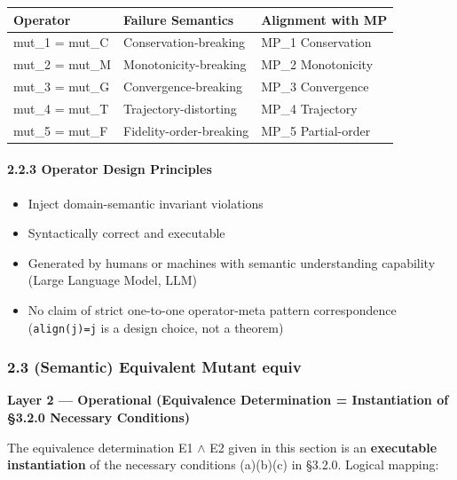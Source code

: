 \documentclass[review,12pt,authoryear]{elsarticle}
\providecommand{\tightlist}{\setlength{\itemsep}{0pt}\setlength{\parskip}{0pt}}
\begin{document}
{\def\LTcaptype{none} %
\begin{longtable}[]{@{}lll@{}}
\toprule\noalign{}
Operator & Failure Semantics & Alignment with MP \\
\midrule\noalign{}
\endhead
\bottomrule\noalign{}
\endlastfoot
mut\_1 = mut\_C & Conservation-breaking & MP\_1 Conservation \\
mut\_2 = mut\_M & Monotonicity-breaking & MP\_2 Monotonicity \\
mut\_3 = mut\_G & Convergence-breaking & MP\_3 Convergence \\
mut\_4 = mut\_T & Trajectory-distorting & MP\_4 Trajectory \\
mut\_5 = mut\_F & Fidelity-order-breaking & MP\_5 Partial-order \\
\end{longtable}
}

\paragraph{2.2.3 Operator Design
Principles}\label{operator-design-principles}

\begin{itemize}
\tightlist
\item
  Inject domain-semantic invariant violations
\item
  Syntactically correct and executable
\item
  Generated by humans or machines with semantic understanding capability
  (Large Language Model, LLM)
\item
  No claim of strict one-to-one operator-meta pattern correspondence
  (\texttt{align(j)=j} is a design choice, not a theorem)
\end{itemize}

\subsubsection{2.3 (Semantic) Equivalent Mutant
equiv}\label{semantic-equivalent-mutant-equiv}

\textbf{Layer 2 --- Operational (Equivalence Determination =
Instantiation of §3.2.0 Necessary Conditions)}

The equivalence determination E1 $\wedge$ E2 given in this section is an
\textbf{executable instantiation} of the necessary conditions (a)(b)(c)
in §3.2.0. Logical mapping:
\end{document}
